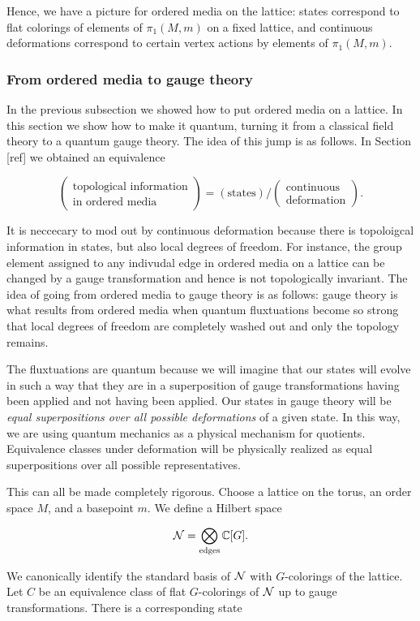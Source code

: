 \documentclass{article}
\theoremstyle{definition}
\numberwithin{figure}{section}
\begin{document}
Hence, we have a picture for ordered media on the lattice: states correspond to flat colorings of elements of $\pi_1(M,m)$ on a fixed lattice, and continuous deformations correspond to certain vertex actions by elements of $\pi_1(M,m)$.

\subsubsection{From ordered media to gauge theory}

In the previous subsection we showed how to put ordered media on a lattice. In this section we show how to make it quantum, turning it from a classical field theory to a quantum gauge theory. The idea of this jump is as follows. In Section [ref] we obtained an equivalence

$$
\left(\substack{\text{topological information}\\ \text{in ordered media}}\right)=\left(\text{states}\right)/\left(\substack{\text{continuous} \\ \text{deformation}}\right).
$$

It is neccecary to mod out by continuous deformation because there is topoloigcal information in states, but also local degrees of freedom. For instance, the group element assigned to any indivudal edge in ordered media on a lattice can be changed by a gauge transformation and hence is not topologically invariant. The idea of going from ordered media to gauge theory is as follows: gauge theory is what results from ordered media when quantum fluxtuations become so strong that local degrees of freedom are completely washed out and only the topology remains.

The fluxtuations are quantum because we will imagine that our states will evolve in such a way that they are in a superposition of gauge transformations having been applied and not having been applied. Our states in gauge theory will be \textit{equal superpositions over all possible deformations} of a given state. In this way, we are using quantum mechanics as a physical mechanism for quotients. Equivalence classes under deformation will be physically realized as equal superpositions over all possible representatives.

This can all be made completely rigorous. Choose a lattice on the torus, an order space $M$, and a basepoint $m$. We define a Hilbert space

$$\mathcal{N}=\bigotimes_{\text{edges}}\mathbb{C}[G].$$

We canonically identify the standard basis of $\mathcal{N}$ with $G$-colorings of the lattice. Let $C$ be an equivalence class of flat $G$-colorings of $\mathcal{N}$ up to gauge transformations. There is a corresponding state
\end{document}
